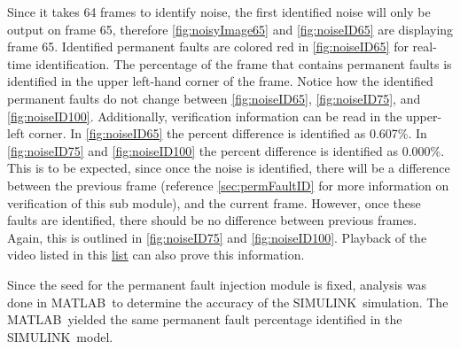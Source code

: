 \par Since it takes 64 frames to identify noise, the first identified noise will only be output on frame 65, therefore \autoref{fig:noisyImage65} and \autoref{fig:noiseID65} are displaying frame 65. Identified permanent faults are colored red in \autoref{fig:noiseID65} for real-time identification. The percentage of the frame that contains permanent faults is identified in the upper left-hand corner of the frame. Notice how the identified permanent faults do not change between \autoref{fig:noiseID65}, \autoref{fig:noiseID75}, and \autoref{fig:noiseID100}. Additionally, verification information can be read in the upper-left corner. In \autoref{fig:noiseID65} the percent difference is identified as 0.607\%. In \autoref{fig:noiseID75} and \autoref{fig:noiseID100} the percent difference is identified as 0.000\%. This is to be expected, since once the noise is identified, there will be a difference between the previous frame (reference \autoref{sec:permFaultID} for more information on verification of this sub module), and the current frame. However, once these faults are identified, there should be no difference between previous frames. Again, this is outlined in \autoref{fig:noiseID75} and \autoref{fig:noiseID100}. Playback of the video listed in this \hyperref[list:urlList]{list} can also prove this information.
\par Since the seed for the permanent fault injection module is fixed, analysis was done in MATLAB\textregisteredmark\ to determine the accuracy of the SIMULINK\textregisteredmark\ simulation. The MATLAB\textregisteredmark\ yielded the same permanent fault percentage identified in the SIMULINK\textregisteredmark\ model.